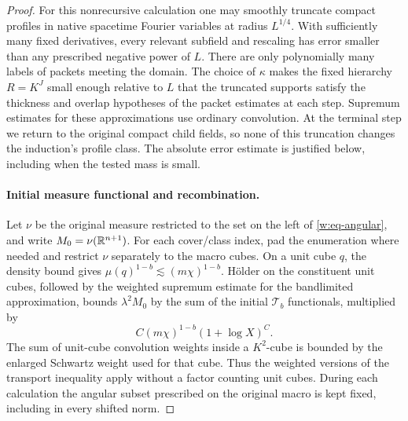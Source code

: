 \begin{proof}
For this nonrecursive calculation one may smoothly truncate compact
profiles in native spacetime Fourier variables at radius $L^{1/4}$.
With sufficiently many fixed derivatives, every relevant subfield and
rescaling has error smaller than any prescribed negative power of $L$.
There are only polynomially many labels of packets meeting the domain.
The choice of $\kappa$ makes the fixed hierarchy $R=K^J$ small enough
relative to $L$ that the truncated supports satisfy the thickness and
overlap hypotheses of the packet estimates at each step.  Supremum
estimates for these approximations use ordinary convolution.  At the
terminal step we return to the original compact child fields, so none
of this truncation changes the induction's profile class.  The absolute
error estimate is justified below, including when the tested mass is
small.

\paragraph{Initial measure functional and recombination.}
Let $\nu$ be the original measure restricted to the set on the left
of \eqref{w:eq-angular}, and write $M_0=\nu(\mathbb R^{n+1})$.
For each cover/class index, pad the enumeration where needed and
restrict $\nu$ separately to the macro cubes.  On a unit cube $q$,
the density bound gives $\mu(q)^{1-b}\lesssim(m\chi)^{1-b}$.
H\"older on the constituent unit cubes, followed by the weighted
supremum estimate for the bandlimited approximation, bounds
$\lambda^2M_0$ by the sum of the initial $\mathcal T_b$ functionals,
multiplied by
\[
 C(m\chi)^{1-b}(1+\log X)^C.
\]
The sum of unit-cube convolution weights inside a $K^2$-cube is bounded
by the enlarged Schwartz weight used for that cube.  Thus the weighted
versions of the transport inequality apply without a factor counting
unit cubes.  During each calculation the angular subset prescribed on
the original macro is kept fixed, including in every shifted norm.


\end{proof}
